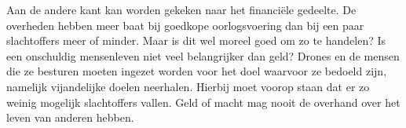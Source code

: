 Aan de andere kant kan worden gekeken naar het financi\"ele gedeelte. De overheden hebben meer baat bij goedkope oorlogsvoering dan bij een paar slachtoffers meer of minder. Maar is dit wel moreel goed om zo te handelen? Is een onschuldig mensenleven niet veel belangrijker dan geld? Drones en de mensen die ze besturen moeten ingezet worden voor het doel waarvoor ze bedoeld zijn, namelijk vijandelijke doelen neerhalen. Hierbij moet voorop staan dat er zo weinig mogelijk slachtoffers vallen. Geld of macht mag nooit de overhand over het leven van anderen hebben.\\ \\

